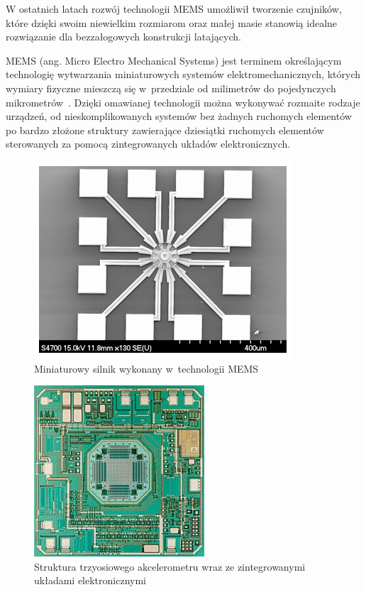 W ostatnich latach rozwój technologii MEMS umożliwił tworzenie czujników, które dzięki swoim niewielkim rozmiarom oraz małej masie stanowią idealne rozwiązanie dla bezzałogowych konstrukcji latających. 

MEMS (ang. Micro Electro Mechanical Systems) jest terminem określającym technologię wytwarzania miniaturowych systemów elektromechanicznych, których wymiary fizyczne mieszczą się w~przedziale od milimetrów do pojedynczych mikrometrów~\cite{mems3, mems12, mems14}. Dzięki omawianej technologii można wykonywać rozmaite rodzaje urządzeń, od nieskomplikowanych systemów bez żadnych ruchomych elementów po bardzo złożone struktury zawierające dziesiątki ruchomych elementów sterowanych za pomocą zintegrowanych układów elektronicznych. 

\begin{figure}[H]
	\centering
	\includegraphics[scale=0.7]{Pictures/microactuator.png}
		\caption[Miniaturowy silnik wykonany w~technologii MEMS]{Miniaturowy silnik wykonany w~technologii MEMS~\cite{mems15}}
	\label{fig:microactuator}
\end{figure}

\begin{figure}[H]
	\centering
	\includegraphics[scale=0.7]{Pictures/3d_accel.jpg}
		\caption[Struktura trzyosiowego akcelerometru wraz ze zintegrowanymi układami elektronicznymi]{Struktura trzyosiowego akcelerometru wraz ze zintegrowanymi układami elektronicznymi~\cite{mems16}}
	\label{fig:3d_accelerometer}
\end{figure}

